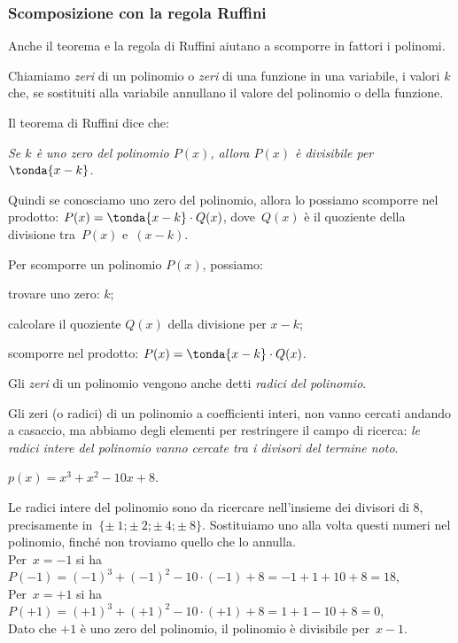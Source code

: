 
\subsubsection{Scomposizione con la regola Ruffini}
\label{subsubsec:divpol_scompruff}

Anche il teorema e la regola di Ruffini aiutano a scomporre in fattori i 
polinomi.

Chiamiamo \emph{zeri} di un polinomio o \emph{zeri} di una funzione in 
una variabile, i valori \(k\) che, se sostituiti alla variabile annullano il 
valore del polinomio o della funzione. 

Il teorema di Ruffini dice che:

\begin{center}
\emph{Se \(k\) è uno zero del polinomio \(P(x)\), allora  
\(P(x)\) è divisibile per \(\tonda{x-k}\).}
\end{center}

Quindi se conosciamo uno zero del polinomio, allora lo possiamo 
scomporre nel prodotto: \(P(x) = \tonda{x-k} \cdot Q(x)\), 
dove~\(Q(x)\) è il quoziente della divisione tra~\(P(x)\) e~\((x-k)\).

\begin{procedura}
Per scomporre un polinomio \(P(x)\), possiamo:
\begin{enumeratea}
\item trovare uno zero: \(k\);
\item calcolare il quoziente \(Q(x)\) della divisione per \(x-k\);
\item scomporre nel prodotto: \(P(x) = \tonda{x-k} \cdot Q(x)\).
\end{enumeratea}
\end{procedura}

Gli \emph{zeri} di un polinomio vengono anche detti \emph{radici del polinomio}.

Gli zeri (o radici) di un polinomio a coefficienti interi, non vanno cercati 
andando a casaccio, ma abbiamo degli elementi per restringere il campo di 
ricerca: 
\emph{le radici intere del polinomio vanno cercate tra i divisori del 
termine noto}.

 \begin{esempio}
 \(p(x)=x^{3}+x^{2}-10x+8\).
 \end{esempio}
Le radici intere del polinomio sono da ricercare nell'insieme dei divisori di 
\(8\), precisamente in~\(\{\pm~1;\pm~2;\pm~4;\pm~8\}\).
Sostituiamo uno alla volta questi numeri nel polinomio, finché non troviamo 
quello che lo annulla.\\
Per~\(x=-1\) si ha~\(P(-1)=(-1)^{3}+(-1)^{2}-10\cdot (-1)+8=-1+1+10+8=18\),\\
Per~\(x=+1\) si ha~\(P(+1)=(+1)^{3}+(+1)^{2}-10\cdot (+1)+8=1+1-10+8=0\),\\
Dato che \(+1\) è uno zero del polinomio, il polinomio è divisibile 
per~\(x-1\).

